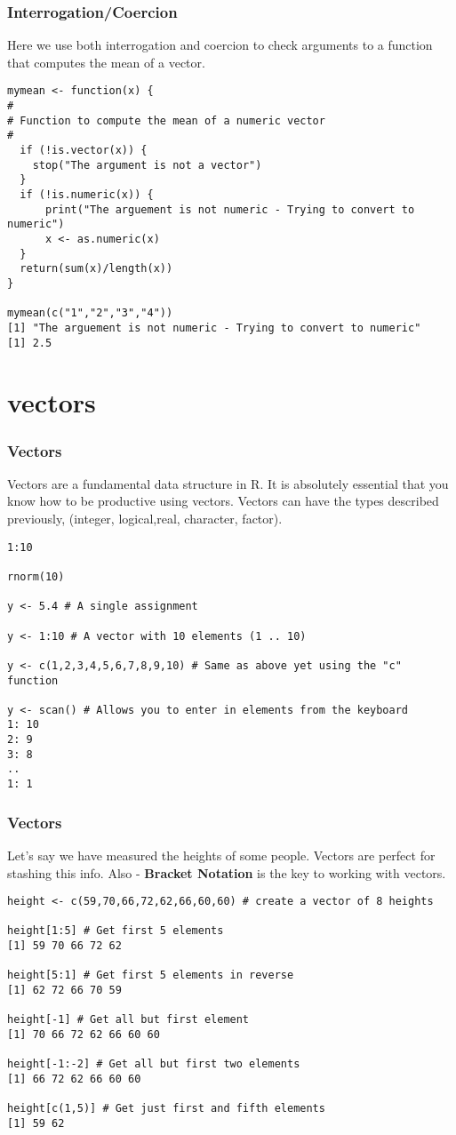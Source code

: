 \documentclass{beamer}
\begin{document}
\begin{frame}[fragile]
\frametitle{Interrogation/Coercion}
Here we use both interrogation and coercion to check arguments to a function that computes the mean of a vector.
\newline
\scriptsize
\begin{verbatim}
mymean <- function(x) {
#
# Function to compute the mean of a numeric vector
#
  if (!is.vector(x)) {
    stop("The argument is not a vector")
  }
  if (!is.numeric(x)) {
      print("The arguement is not numeric - Trying to convert to numeric")
      x <- as.numeric(x)
  }   
  return(sum(x)/length(x))
}

mymean(c("1","2","3","4"))
[1] "The arguement is not numeric - Trying to convert to numeric"
[1] 2.5
\end{verbatim}
\end{frame}

\section{vectors}
\begin{frame}[fragile]
\frametitle{Vectors}
Vectors are a fundamental data structure in R. It is absolutely essential that you know how to be 
productive using vectors. Vectors can have the types described previously, (integer, logical,real, character, factor).
\newline
\footnotesize
\begin{verbatim}
1:10

rnorm(10)

y <- 5.4 # A single assignment

y <- 1:10 # A vector with 10 elements (1 .. 10)

y <- c(1,2,3,4,5,6,7,8,9,10) # Same as above yet using the "c" function

y <- scan() # Allows you to enter in elements from the keyboard
1: 10
2: 9
3: 8
..
1: 1
\end{verbatim}
\end{frame}

\begin{frame}[fragile]
\frametitle{Vectors}
Let's say we have measured the heights of some people. Vectors are perfect for stashing this info.
Also - \textbf{Bracket Notation} is the key to working with vectors.
\newline
\scriptsize
\begin{verbatim}
height <- c(59,70,66,72,62,66,60,60) # create a vector of 8 heights

height[1:5] # Get first 5 elements
[1] 59 70 66 72 62

height[5:1] # Get first 5 elements in reverse
[1] 62 72 66 70 59

height[-1] # Get all but first element
[1] 70 66 72 62 66 60 60

height[-1:-2] # Get all but first two elements
[1] 66 72 62 66 60 60

height[c(1,5)] # Get just first and fifth elements
[1] 59 62
\end{verbatim}
\end{frame}
\end{document}
